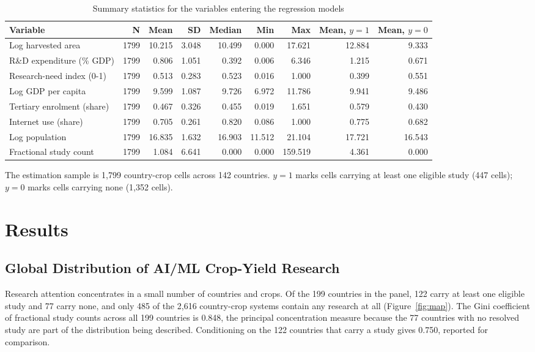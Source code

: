 \documentclass[ASNA,twocolumn]{USG}
\begin{document}
\begin{table}[!t]
\centering
\caption{Summary statistics for the variables entering the regression models}
\label{tab:summstats}
\begin{tabular*}{\textwidth}{@{\extracolsep\fill}l r r r r r r r r@{}}
\toprule
Variable & N & Mean & SD & Median & Min & Max & Mean, $y=1$ & Mean, $y=0$ \\
\midrule
Log harvested area & 1799 & 10.215 & 3.048 & 10.499 & 0.000 & 17.621 & 12.884 & 9.333 \\
R\&D expenditure (\% GDP) & 1799 & 0.806 & 1.051 & 0.392 & 0.006 & 6.346 & 1.215 & 0.671 \\
Research-need index (0-1) & 1799 & 0.513 & 0.283 & 0.523 & 0.016 & 1.000 & 0.399 & 0.551 \\
Log GDP per capita & 1799 & 9.599 & 1.087 & 9.726 & 6.972 & 11.786 & 9.941 & 9.486 \\
Tertiary enrolment (share) & 1799 & 0.467 & 0.326 & 0.455 & 0.019 & 1.651 & 0.579 & 0.430 \\
Internet use (share) & 1799 & 0.705 & 0.261 & 0.820 & 0.086 & 1.000 & 0.775 & 0.682 \\
Log population & 1799 & 16.835 & 1.632 & 16.903 & 11.512 & 21.104 & 17.721 & 16.543 \\
Fractional study count & 1799 & 1.084 & 6.641 & 0.000 & 0.000 & 159.519 & 4.361 & 0.000 \\
\bottomrule
\end{tabular*}
\begin{tablenotes}
\item[] The estimation sample is 1,799 country-crop cells across 142 countries. $y=1$ marks cells carrying at least one eligible study (447 cells); $y=0$ marks cells carrying none (1,352 cells).
\end{tablenotes}
\end{table}

\section{Results}

\subsection{Global Distribution of AI/ML Crop-Yield Research}

Research attention concentrates in a small number of countries and crops. Of the 199
countries in the panel, 122 carry at least one eligible study and 77 carry none, and only 485
of the 2,616 country-crop systems contain any research at all (Figure~\ref{fig:map}). The Gini
coefficient of fractional study counts across all 199 countries is 0.848, the principal
concentration measure because the 77 countries with no resolved study are part of the
distribution being described. Conditioning on the 122 countries that carry a study gives 0.750, reported for comparison.
\end{document}
